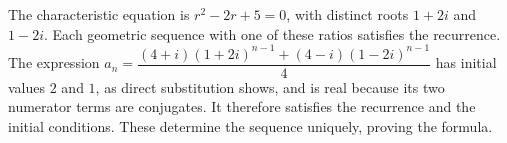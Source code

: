 The characteristic equation is $r^2-2r+5=0$, with distinct roots $1+2i$ and $1-2i$. Each geometric sequence with one of these ratios satisfies the recurrence. The expression $\boxed{a_n=\dfrac{(4+i)(1+2i)^{n-1}+(4-i)(1-2i)^{n-1}}{4}}$ has initial values $2$ and $1$, as direct substitution shows, and is real because its two numerator terms are conjugates. It therefore satisfies the recurrence and the initial conditions. These determine the sequence uniquely, proving the formula.
